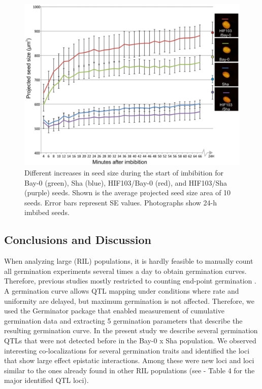 \begin{figure}[h!]
  \centering
  \includegraphics[keepaspectratio,scale=0.30]{eps/image_3_1_9.eps}
  \caption[Seed Swelling.]{Different increases in seed size during the start of imbibition for Bay-0 (green), Sha (blue), 
          HIF103/Bay-0 (red), and HIF103/Sha (purple) seeds. Shown is the average projected seed size area of 10 seeds. 
          Error bars represent SE values. Photographs show 24-h imbibed seeds.}
          \label{fig:swelling}
\end{figure}

\subsection{Conclusions and Discussion}
When analyzing large (RIL) populations, it is hardly feasible to manually count all germination 
experiments several times a day to obtain germination curves. Therefore, previous studies mostly 
restricted to counting end-point germination \cite{Quesada:2002, Alonso-Blanco:2003, Clerkx:2004, 
Laserna:2008, Meng:2008, Bentsink:2010, Galpaz:2010, Vallejo:2010}. A germination curve allows QTL 
mapping under conditions where rate and uniformity are delayed, but maximum germination is not 
affected. Therefore, we used the Germinator package \cite{Joosen:2010} that enabled measurement 
of cumulative germination data and extracting 5 germination parameters that describe the resulting 
germination curve. In the present study we describe several germination QTLs that were not detected 
before in the Bay-0 x Sha population. We observed interesting co-localizations for several germination 
traits and identified the loci that show large effect epistatic interactions. Among these were new 
loci and loci similar to the ones already found in other RIL populations (see \cite{Joosen:2011} - Table 4 for 
the major identified QTL loci).

